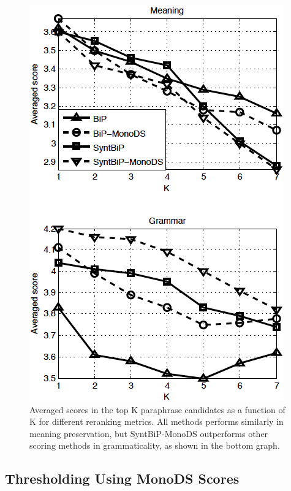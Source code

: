 \documentclass[11pt]{article}
\newcommand{\mnote}[1]{\marginpar{\raggedleft\footnotesize\itshape#1}}
\begin{document}
\begin{figure}
\begin{center}
\includegraphics[width=0.78\linewidth]{meanTopK_vertical_LW2_MS8_2} %
\end{center}
\caption{\small Averaged scores in the top K paraphrase candidates as a function of K for different reranking metrics. All methods performs similarly in meaning preservation, but SyntBiP-MonoDS outperforms other scoring methods in grammaticality, as shown in the bottom graph.\vspace{-.12cm}}
\label{fig_meanTopK}
\end{figure}

\vspace{-.1cm}
\subsection{Thresholding Using MonoDS Scores}
\vspace{-.1cm}
\end{document}
